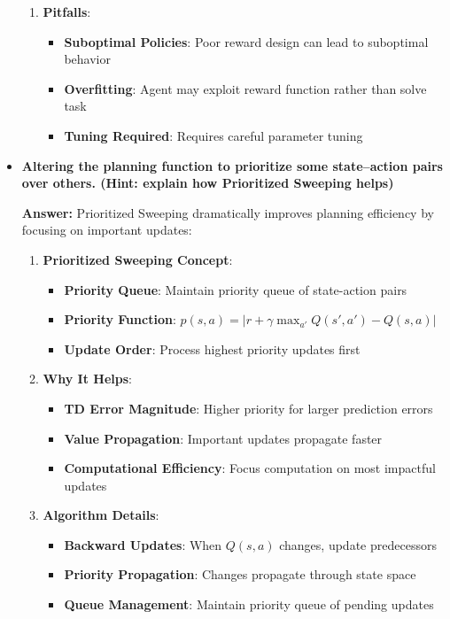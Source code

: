 \begin{itemize}
\begin{enumerate}
        \item \textbf{Pitfalls}:
        \begin{itemize}
            \item \textbf{Suboptimal Policies}: Poor reward design can lead to suboptimal behavior
            \item \textbf{Overfitting}: Agent may exploit reward function rather than solve task
            \item \textbf{Tuning Required}: Requires careful parameter tuning
        \end{itemize}
    \end{enumerate}
    
    \item \textbf{Altering the planning function to prioritize some state–action pairs over others. (Hint: explain how \textbf{Prioritized Sweeping} helps)}
    
    \textbf{Answer:} Prioritized Sweeping dramatically improves planning efficiency by focusing on important updates:
    
    \begin{enumerate}
        \item \textbf{Prioritized Sweeping Concept}:
        \begin{itemize}
            \item \textbf{Priority Queue}: Maintain priority queue of state-action pairs
            \item \textbf{Priority Function}: $p(s,a) = |r + \gamma \max_{a'} Q(s',a') - Q(s,a)|$
            \item \textbf{Update Order}: Process highest priority updates first
        \end{itemize}
        
        \item \textbf{Why It Helps}:
        \begin{itemize}
            \item \textbf{TD Error Magnitude}: Higher priority for larger prediction errors
            \item \textbf{Value Propagation}: Important updates propagate faster
            \item \textbf{Computational Efficiency}: Focus computation on most impactful updates
        \end{itemize}
        
        \item \textbf{Algorithm Details}:
        \begin{itemize}
            \item \textbf{Backward Updates}: When $Q(s,a)$ changes, update predecessors
            \item \textbf{Priority Propagation}: Changes propagate through state space
            \item \textbf{Queue Management}: Maintain priority queue of pending updates
        \end{itemize}
        

\end{enumerate}
\end{itemize}
